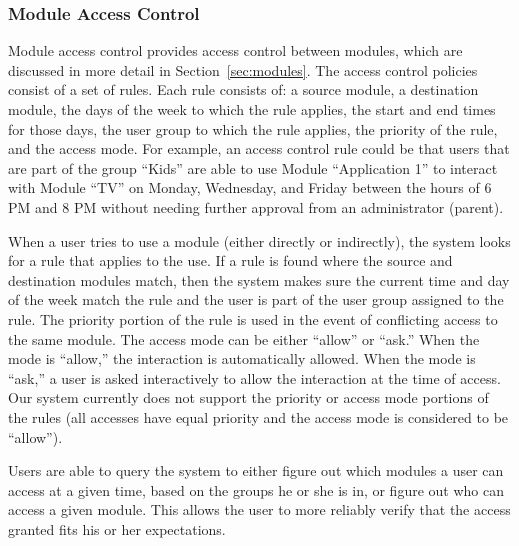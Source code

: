 \subsubsection{Module Access Control}
Module access control provides access control between modules, which are
discussed in more detail in Section~\ref{sec:modules}. The access control
policies consist of a set of rules. Each rule consists of: a source module, a
destination module, the days of the week to which the rule applies, the start
and end times for those days, the user group to which the rule applies, the
priority of the rule, and the access mode. For example, an access control rule
could be that users that are part of the group ``Kids'' are able to use Module
``Application 1'' to interact with Module ``TV'' on Monday, Wednesday, and
Friday between the hours of 6 PM and 8 PM without needing further approval from
an administrator (parent).

When a user tries to use a module (either directly or indirectly), the system
looks for a rule that applies to the use. If a rule is found where the source
and destination modules match, then the system makes sure the current time and
day of the week match the rule and the user is part of the user group assigned
to the rule. The priority portion of the rule is used in the event of
conflicting access to the same module. The access mode can be either ``allow''
or ``ask.'' When the mode is ``allow,'' the interaction is automatically
allowed. When the mode is ``ask,'' a user is asked interactively to allow the
interaction at the time of access. Our system currently does not support the
priority or access mode portions of the rules (all accesses have equal priority
and the access mode is considered to be ``allow'').

Users are able to query the system to either figure out which modules a user can
access at a given time, based on the groups he or she is in, or figure out who
can access a given module. This allows the user to more reliably verify that the
access granted fits his or her expectations.
